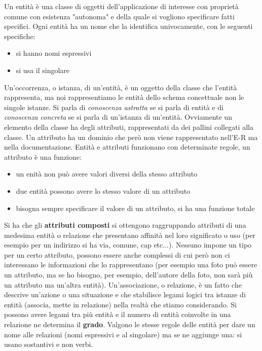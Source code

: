 \documentclass[a4paper,12pt, oneside]{book}
\begin{document}
Un entità è una classe di oggetti dell'applicazione di interesse con proprietà comune con esistenza "autonoma" e della quale si vogliono specificare fatti specifici. Ogni entità ha un nome che la identifica univocamente, con le seguenti specifiche:
\begin{itemize}
\item si hanno nomi espressivi
\item si usa il singolare
\end{itemize}
Un'occorrenza, o istanza, di un'entità, è un oggetto della classe che l'entità rappresenta, ma noi rappresentiamo le entità dello schema concettuale non le singole istanze. Si parla di \textit{ conoscenza astratta} se si parla di entità e di \textit{conoscenza concreta} se si parla di un'istanza di un'entità. Ovviamente un elemento della classe ha degli attributi, rappresentati da dei pallini collegati alla classe. Un attributo ha un dominio che però non viene rappresentato nell'E-R ma nella documentazione. Entità e attributi funzionano con determinate regole, un attributo è una funzione:
\begin{itemize}
\item un enità non può avere valori diversi della stesso attributo
\item due entità possono avere lo stesso valore di un attributo
\item bisogna sempre specificare il valore di un attributo, si ha una funzione totale
\end{itemize}
Si ha che gli \textbf{attributi composti} si ottengono raggruppando attributi di una
medesima entità o relazione che presentano
affinità nel loro significato o uso (per esempio per un indirizzo si ha via, comune, cap etc...). Nessuno impone un tipo per un certo attributo, possono essere anche complessi di cui però non ci interessano le informazioni che lo rappresentano (per esempio una foto può essere un attributo, ma se ho bisogno, per esempio, dell'autore della foto, non sarà più un attributo ma un'altra entità). 
Un'associazione, o relazione, è un fatto che descrive un'azione o una situazione e che stabilisce legami logici tra
istanze di entità (associa, mette in relazione)
nella realtà che stiamo considerando. Si possono avere legami tra più entità e il numero di entità coinvolte in una relazione ne determina il \textbf{grado}. Valgono le stesse regole delle entità per dare un nome alle relazioni (nomi espressivi e al singolare) ma se ne aggiunge una: si usano sostantivi e non verbi. \\
\end{document}
